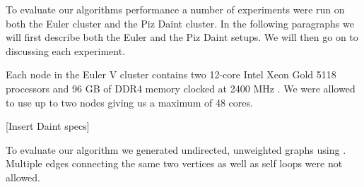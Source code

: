 To evaluate our algorithms performance a number of experiments were run on both the Euler cluster and the Piz Daint cluster. In the following paragraphs we will first describe both the Euler and the Piz Daint setups. We will then go on to discussing each experiment.

Each node in the Euler V cluster contains two 12-core Intel Xeon Gold 5118 processors and 96 GB of DDR4 memory clocked at 2400 MHz \cite{Euler}. We were allowed to use up to two nodes giving us a maximum of 48 cores.

 [Insert Daint specs]

To evaluate our algorithm we generated undirected, unweighted graphs using \cite{Parmat}. Multiple edges connecting the same two vertices as well as self loops were not allowed.

